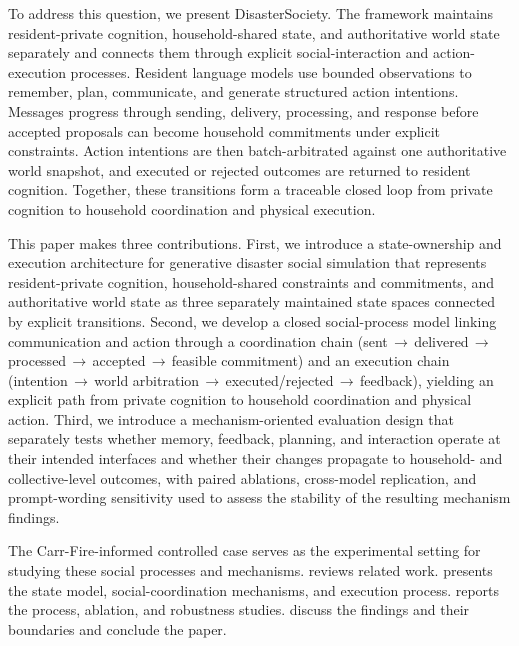 \documentclass[journal]{IEEEtran}
\begin{document}
To address this question, we present DisasterSociety. The framework maintains resident-private cognition, household-shared state, and authoritative world state separately and connects them through explicit social-interaction and action-execution processes. Resident language models use bounded observations to remember, plan, communicate, and generate structured action intentions. Messages progress through sending, delivery, processing, and response before accepted proposals can become household commitments under explicit constraints. Action intentions are then batch-arbitrated against one authoritative world snapshot, and executed or rejected outcomes are returned to resident cognition. Together, these transitions form a traceable closed loop from private cognition to household coordination and physical execution.

This paper makes three contributions. First, we introduce a state-ownership and execution architecture for generative disaster social simulation that represents resident-private cognition, household-shared constraints and commitments, and authoritative world state as three separately maintained state spaces connected by explicit transitions. Second, we develop a closed social-process model linking communication and action through a coordination chain (sent$\,\to\,$delivered$\,\to\,$processed$\,\to\,$accepted$\,\to\,$feasible commitment) and an execution chain (intention$\,\to\,$world arbitration$\,\to\,$executed/rejected$\,\to\,$feedback), yielding an explicit path from private cognition to household coordination and physical action. Third, we introduce a mechanism-oriented evaluation design that separately tests whether memory, feedback, planning, and interaction operate at their intended interfaces and whether their changes propagate to household- and collective-level outcomes, with paired ablations, cross-model replication, and prompt-wording sensitivity used to assess the stability of the resulting mechanism findings.

The Carr-Fire-informed controlled case serves as the experimental setting for studying these social processes and mechanisms.  reviews related work.  presents the state model, social-coordination mechanisms, and execution process.  reports the process, ablation, and robustness studies.  discuss the findings and their boundaries and conclude the paper.

\end{document}
